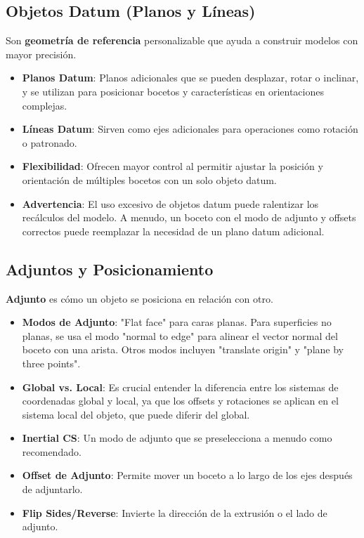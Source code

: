 \documentclass{article}
\begin{document}
\subsection*{Objetos Datum (Planos y Líneas)}
Son \textbf{geometría de referencia} personalizable que ayuda a construir modelos con mayor precisión.
\begin{itemize}[noitemsep,topsep=0pt]
    \item \textbf{Planos Datum}: Planos adicionales que se pueden desplazar, rotar o inclinar, y se utilizan para posicionar bocetos y características en orientaciones complejas.
    \item \textbf{Líneas Datum}: Sirven como ejes adicionales para operaciones como rotación o patronado.
    \item \textbf{Flexibilidad}: Ofrecen mayor control al permitir ajustar la posición y orientación de múltiples bocetos con un solo objeto datum.
    \item \textbf{Advertencia}: El uso excesivo de objetos datum puede ralentizar los recálculos del modelo. A menudo, un boceto con el modo de adjunto y offsets correctos puede reemplazar la necesidad de un plano datum adicional.
\end{itemize}

\subsection*{Adjuntos y Posicionamiento}
\textbf{Adjunto} es cómo un objeto se posiciona en relación con otro.
\begin{itemize}[noitemsep,topsep=0pt]
    \item \textbf{Modos de Adjunto}: "Flat face" para caras planas. Para superficies no planas, se usa el modo "normal to edge" para alinear el vector normal del boceto con una arista. Otros modos incluyen "translate origin" y "plane by three points".
    \item \textbf{Global vs. Local}: Es crucial entender la diferencia entre los sistemas de coordenadas global y local, ya que los offsets y rotaciones se aplican en el sistema local del objeto, que puede diferir del global.
    \item \textbf{Inertial CS}: Un modo de adjunto que se preselecciona a menudo como recomendado.
    \item \textbf{Offset de Adjunto}: Permite mover un boceto a lo largo de los ejes después de adjuntarlo.
    \item \textbf{Flip Sides/Reverse}: Invierte la dirección de la extrusión o el lado de adjunto.
\end{itemize}
\end{document}
